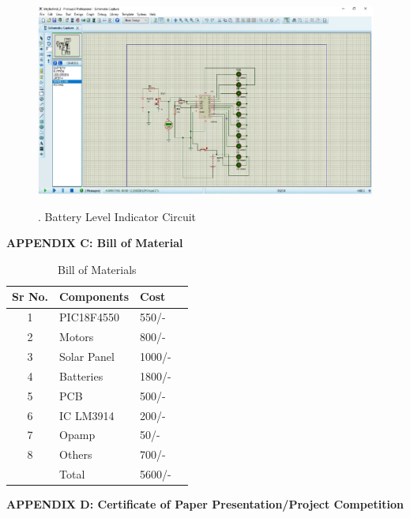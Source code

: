 \documentclass[a4paper,12pt]{article}
\begin{document}
\newpage
\begin{figure}[!h]
\centering
\includegraphics[scale=0.5]{bli.png}\\
\caption{. Battery Level Indicator Circuit}
\end{figure}

\newpage
\begin{center}
\LARGE\textbf{APPENDIX C: Bill of Material}
\end{center}
\begin{table}[!ht]
\centering

\begin{adjustbox}{width=0.7\textwidth}
\begin{tabular}{|c|l|l|p{6cm}|}
\hline
\textbf{Sr No.}
&
\textbf{Components}
&
\textbf{Cost}\\
\hline
1
&
PIC18F4550
&
550/-\\
\hline
2
&
Motors
&
800/-\\
\hline
3
&
Solar Panel
&
1000/-\\
\hline
4
&
Batteries
&
1800/-\\
\hline
5
&
PCB
&
500/-\\
\hline
6
&
IC LM3914
&
200/-\\
\hline
7
&
Opamp
&
50/-\\
\hline
8
&
Others
&
700/-\\
\hline

&
Total
&
5600/-\\
\hline
\end{tabular}
\end{adjustbox}
\caption{Bill of Materials}
\end{table}
\clearpage


\newpage
\thispagestyle{empty}
\vspace*{0.25\textheight}
\begin{center}
\LARGE\textbf{APPENDIX D: Certificate of Paper Presentation/Project Competition}
\end{center}
\newpage

\end{document}
